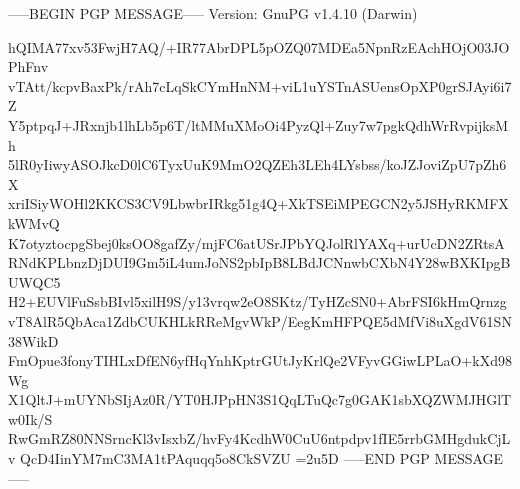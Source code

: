 -----BEGIN PGP MESSAGE-----
Version: GnuPG v1.4.10 (Darwin)

hQIMA77xv53FwjH7AQ/+IR77AbrDPL5pOZQ07MDEa5NpnRzEAchHOjO03JOPhFnv
vTAtt/kcpvBaxPk/rAh7cLqSkCYmHnNM+viL1uYSTnASUensOpXP0grSJAyi6i7Z
Y5ptpqJ+JRxnjb1lhLb5p6T/ltMMuXMoOi4PyzQl+Zuy7w7pgkQdhWrRvpijksMh
5lR0yIiwyASOJkcD0lC6TyxUuK9MmO2QZEh3LEh4LYsbss/koJZJoviZpU7pZh6X
xriISiyWOHl2KKCS3CV9LbwbrIRkg51g4Q+XkTSEiMPEGCN2y5JSHyRKMFXkWMvQ
K7otyztocpgSbej0ksOO8gafZy/mjFC6atUSrJPbYQJolRlYAXq+urUcDN2ZRtsA
RNdKPLbnzDjDUI9Gm5iL4umJoNS2pbIpB8LBdJCNnwbCXbN4Y28wBXKIpgBUWQC5
H2+EUVlFuSsbBIvl5xilH9S/y13vrqw2eO8SKtz/TyHZcSN0+AbrFSI6kHmQrnzg
vT8AlR5QbAca1ZdbCUKHLkRReMgvWkP/EegKmHFPQE5dMfVi8uXgdV61SN38WikD
FmOpue3fonyTIHLxDfEN6yfHqYnhKptrGUtJyKrlQe2VFyvGGiwLPLaO+kXd98Wg
X1QltJ+mUYNbSIjAz0R/YT0HJPpHN3S1QqLTuQc7g0GAK1sbXQZWMJHGlTw0Ik/S
RwGmRZ80NNSrncKl3vIsxbZ/hvFy4KcdhW0CuU6ntpdpv1fIE5rrbGMHgdukCjLv
QcD4IinYM7mC3MA1tPAquqq5o8CkSVZU
=2u5D
-----END PGP MESSAGE-----
